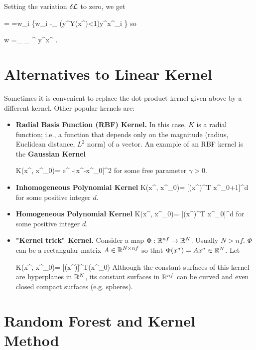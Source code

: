 Setting the variation $\delta {\cal L}$
to zero, we get

=\delta \call
=\delta w_i
\left\{w_i -\sum_\s
\indi(y^\s Y(x^\s)<1)y^\s x^\s_i
\right\}
\eeq
so

\beq
 w =\sum_\s
{}_
{\alp^\s}
y^\s x^\s
\;.
\eeq




\section{Alternatives to Linear Kernel}
Sometimes it is convenient to replace
the dot-product kernel given above by 
a different kernel.
Other popular kernels are:

\begin{itemize}
\item 
{\bf Radial Basis Function (RBF) Kernel.}
In this case,
 $K$ is a radial function; i.e., a
function that depends only on 
the magnitude (radius, Euclidean distance,
$L^2$ norm) of a vector. An example of an RBF kernel is the
{\bf Gaussian Kernel}

\beq
K(x^\s, x^{\s_0})=
e^{ -\gamma |x^\s-x^{\s_0}|^2}
\eeq
for some free parameter $\gamma>0$.

\item
{\bf Inhomogeneous Polynomial Kernel}
\beq
K(x^\s, x^{\s_0})=
[(x^\s)^T x^{\s_0}+1]^d
\eeq
for some positive integer $d$.

\item
{\bf Homogeneous Polynomial Kernel}
\beq
K(x^\s, x^{\s_0})=
[(x^\s)^T x^{\s_0}]^d
\eeq
for some positive integer $d$.


\item
{\bf "Kernel trick" Kernel.}
Consider a map $\Phi:{ \mathbb{R}}^{nf}\rightarrow { \mathbb{R}}^N$.
Usually $N>nf$. $\Phi$ can be a
rectangular matrix 
$A\in{ \mathbb{R}}^{N\times nf}$
so that $\Phi(x^\sigma)=Ax^\sigma\in { \mathbb{R}}^N$. Let



\beq
K(x^\s, x^{\s_0})=
[\Phi(x^\s)]^T\Phi(x^{\s_0})
\eeq
Although the constant surfaces  of 
this kernel are
hyperplanes in ${ \mathbb{R}}^N$,
its constant
surfaces in ${ \mathbb{R}}^{nf}$
can be curved and even closed 
compact surfaces (e.g. spheres).

\end{itemize}

\section{Random Forest and Kernel Method}
